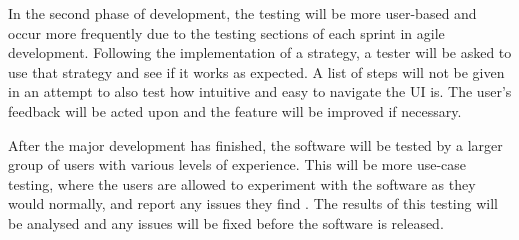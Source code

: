 In the second phase of development, the testing will be more user-based and occur more frequently due to the testing sections of each sprint in agile development. Following the implementation of a strategy, a tester will be asked to use that strategy and see if it works as expected. A list of steps will not be given in an attempt to also test how intuitive and easy to navigate the UI is. The user's feedback will be acted upon and the feature will be improved if necessary.

After the major development has finished, the software will be tested by a larger group of users with various levels of experience. This will be more use-case testing, where the users are allowed to experiment with the software as they would normally, and report any issues they find \cite{UseCaseTesting}. The results of this testing will be analysed and any issues will be fixed before the software is released.